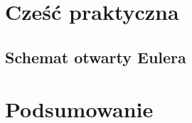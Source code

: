 \documentclass[12pt,a4paper]{report}
\begin{document}


\chapter{Cześć praktyczna}

\section{Schemat otwarty Eulera}


\begin{example}[Przykład] \label{example-otwarty-euler}
\end{example}

\chapter{Podsumowanie}



\end{document}
